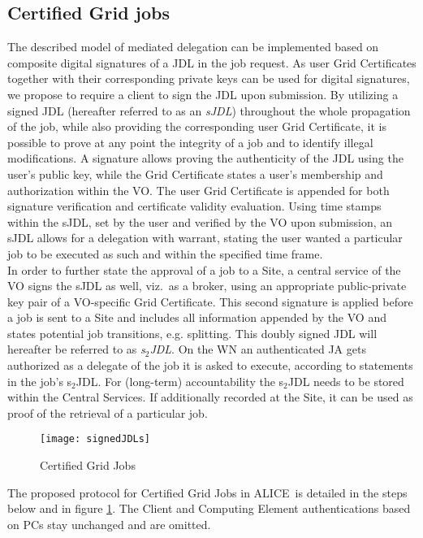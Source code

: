 \documentclass[10pt]{iopart}
\newcommand{\alice}{ALICE}
\begin{document}
\subsection{Certified Grid jobs}
\label{sjdl}
The described model of mediated delegation can be implemented based on 
composite digital signatures of a JDL in the job request.
As user Grid Certificates together with their corresponding private keys can
be used for digital signatures, we
propose to require a client to sign the JDL upon submission.
By utilizing a signed JDL (hereafter referred to as an \textit{sJDL})
throughout the whole propagation of the job, while also providing the corresponding 
user Grid Certificate, it is 
possible to prove at any point the integrity of a job and to identify illegal
modifications. A signature allows proving the authenticity of the
JDL using the user's public key, while the Grid Certificate states a user's
membership and authorization within the VO.
The user Grid Certificate is appended for both signature verification and
certificate validity evaluation. Using time stamps within the sJDL, set by the user and
verified by the VO upon submission, an sJDL allows for a delegation with
warrant, stating the user wanted a particular job to be executed as such and within
the specified time frame.\\
In order to further
state the approval of a job to a Site, a central service of the VO signs the
sJDL as well, viz.\ as a broker, using an appropriate public-private key pair of a
VO-specific Grid Certificate. This second
signature is applied before a job is sent to a Site and includes all
information appended by the VO and states potential job transitions,
e.g. splitting. This doubly signed JDL will hereafter be referred to as
\textit{s$_2$JDL}. On the WN an authenticated JA gets authorized
as a delegate of the job it is asked to execute,
according to statements in the job's
s$_2$JDL. For (long-term) accountability the 
 s$_2$JDL needs to be stored within the Central
Services. If additionally recorded at the Site, it can be used as proof
of the retrieval of a particular job.
\begin{figure}[h]
\centering
\texttt{[image: signedJDLs]}
\caption{Certified Grid Jobs}
\label{sJDL}
\end{figure}
The proposed protocol for Certified Grid Jobs in \alice\ is
detailed in the steps below and in figure \ref{sJDL}. 
The Client and Computing Element authentications based on PCs stay
unchanged and are omitted.\\
\end{document}

